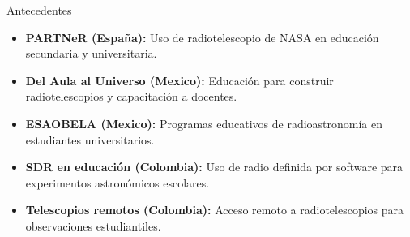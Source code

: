 \begin{frame}{Antecedentes}
  \begin{itemize}
    \item \textbf{PARTNeR (España):} Uso de radiotelescopio de NASA en educación secundaria y universitaria.
      \pause
    \item \textbf{Del Aula al Universo (Mexico):} Educación para construir radiotelescopios y capacitación a docentes.
      \pause
    \item \textbf{ESAOBELA (Mexico):} Programas educativos de radioastronomía en estudiantes universitarios.
      \pause
    \item \textbf{SDR en educación (Colombia):} Uso de radio definida por software para experimentos astronómicos escolares.
      \pause
    \item \textbf{Telescopios remotos (Colombia):} Acceso remoto a radiotelescopios para observaciones estudiantiles.
  \end{itemize}
\end{frame}

